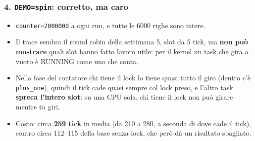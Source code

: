 \subsubsection*{4. \texttt{DEMO=spin}: corretto, ma caro}
\begin{itemize}
    \item \texttt{counter=2000000} a ogni run, e tutte le 6000 righe sono intere.
    \item Il trace sembra il round robin della settimana 5, slot da 5 tick, ma \textbf{non può mostrare} quali slot hanno fatto lavoro utile: per il kernel un task che gira a vuoto è RUNNING come uno che conta.
    \item Nella fase del contatore chi tiene il lock lo tiene quasi tutto il giro (dentro c'è \texttt{plus\_one}), quindi il tick cade quasi sempre col lock preso, e l'altro task \textbf{spreca l'intero slot}: su una CPU sola, chi tiene il lock non può girare mentre tu giri.
    \item Costo: circa \textbf{259 tick} in media (da 210 a 280, a seconda di dove cade il tick), contro circa 112--115 della base senza lock, che però dà un risultato sbagliato.
\end{itemize}

